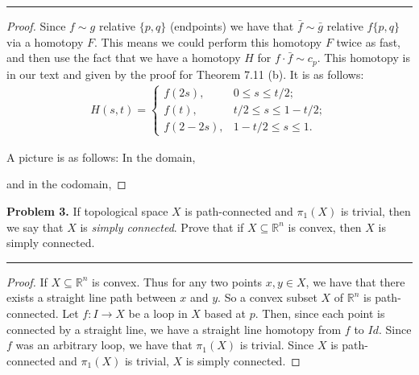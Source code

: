 \documentclass[leqno]{article}
\theoremstyle{nonumberplain}
\newtheorem{proof}{Proof}
\begin{document}
\noindent\rule[0.5ex]{\linewidth}{1pt}

\begin{proof}
Since $f\sim g$ relative $\{p,q\}$ (endpoints) we have that $\bar{f} \sim \bar{g}$ relative $f\{p,q\}$ via a homotopy $F$. This means we could perform this homotopy $F$ twice as fast, and then use the fact that we have a homotopy $H$ for $f\cdot \bar{f}\sim c_p$.  This homotopy is in our text and given by the proof for Theorem 7.11 (b).  It is as follows:
\begin{align*}
H(s,t)=\begin{cases}
f(2s), &0\leq s \leq t/2;\\
f(t), &t/2\leq s \leq 1-t/2;\\
f(2-2s), &1-t/2\leq s \leq 1.
\end{cases}
\end{align*}

\noindent A picture is as follows: In the domain,
\vspace*{4cm}

\noindent and in the codomain,

\end{proof}


\pagebreak




\noindent\textbf{Problem 3.} If topological space $X$ is path-connected and $\pi_1(X)$ is trivial, then we say that $X$ is \emph{simply connected}. Prove that if $X\subseteq \mathbb{R}^n$ is convex, then $X$ is simply connected.

\noindent\rule[0.5ex]{\linewidth}{1pt}

\begin{proof} If $X\subseteq \mathbb{R}^n$  is convex.  Thus for any two points $x,y \in X$, we have that there exists a straight line path between $x$ and $y$.  So a convex subset $X$ of $\mathbb{R}^n$ is path-connected.  Let $f\colon I \to X$ be a loop in $X$ based at $p$.  Then, since each point is connected by a straight line, we have a straight line homotopy from $f$ to $Id$.  Since $f$ was an arbitrary loop, we have that $\pi_1 (X)$ is trivial.  Since $X$ is path-connected and $\pi_1 (X)$ is trivial, $X$ is simply connected.
\end{proof}
\end{document}
